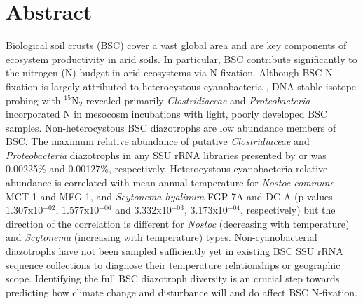 \section{Abstract}
Biological soil crusts (BSC) cover a vast global area and are key components of ecosystem productivity in arid soils. In particular, BSC contribute significantly to the nitrogen (N) budget in arid ecosystems via N-fixation. Although BSC N-fixation is largely attributed to heterocystous cyanobacteria \citep{Yeager, 14766579, Yeager_2012}, DNA stable isotope probing with $^{15}$N$_{2}$ revealed primarily \textit{Clostridiaceae} and \textit{Proteobacteria} incorporated N in mesocosm incubations with light, poorly developed BSC samples. Non-heterocystous BSC diazotrophs are low abundance members of BSC. The maximum relative abundance of putative \textit{Clostridiaceae} and \textit{Proteobacteria} diazotrophs in any SSU rRNA libraries presented by \citet{Garcia_Pichel_2013} or \citet{Steven_2013} was 0.00225\% and 0.00127\%, respectively. Heterocystous cyanobacteria relative abundance is correlated with mean annual temperature for \textit{Nostoc commune} MCT-1 and MFG-1, and \textit{Scytonema hyalinum} FGP-7A and DC-A (p-values 1.307x10$^{-02}$, 1.577x10$^{-06}$ and 3.332x10$^{-03}$, 3.173x10$^{-04}$, respectively) but the direction of the correlation is different for \textit{Nostoc} (decreasing with temperature) and \textit{Scytonema} (increasing with temperature) types. Non-cyanobacterial diazotrophs have not been sampled sufficiently yet in existing BSC SSU rRNA sequence collections to diagnose their temperature relationships or geographic scope. Identifying the full BSC diazotroph diversity is an crucial step towards predicting how climate change and disturbance will and do affect BSC N-fixation.
